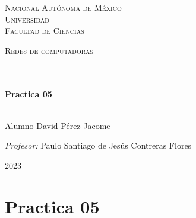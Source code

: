 \documentclass[14pt]{book}
\begin{document}
\begin{center}
\begin{minipage}{0.48\textwidth}
\begin{flushright}
    \end{flushright}
  \end{minipage}
  \vspace*{-1.5cm}
  \textsc{\huge Nacional Autónoma de México \\ \vspace{-4px} Universidad }\\[2cm]
  \textsc{\LARGE Facultad de Ciencias}\\[1.5cm]
  \begin{minipage}{0.9\textwidth}
    \begin{center}
      \textsc{\LARGE Redes de computadoras}
    \end{center}
  \end{minipage}\\[0.5cm]
  \vspace*{1cm}
  \HRule \\[0.4cm]
  { \huge \bfseries Practica 05}\\[0.4cm]
  \HRule \\[1.5cm]
  \begin{minipage}{0.52\textwidth}
    \begin{flushleft} \large \small \vspace{-0.6cm} \vspace{-0.6cm}
      Alumno David Pérez Jacome \\
    \end{flushleft}
  \end{minipage}
  \begin{minipage}{0.46\textwidth}
    \vspace{-0.6cm}
    \begin{flushright} \large \small \emph{Profesor:}
      Paulo Santiago de Jesús Contreras Flores \\
    \end{flushright}
  \end{minipage}
  \vspace*{1cm}
  \vspace{2cm}
  \begin{center}
    {\large 2023}
  \end{center}
\end{center}
\newpage

{\color{blue} \section*{\textbf{Practica 05}}}
\vspace{1em}
\end{document}
